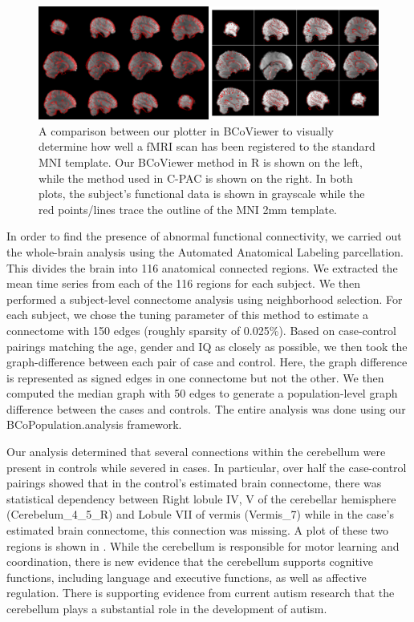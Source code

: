 \documentclass{nature}
\begin{document}
\begin{figure}[tb]
\centering
\includegraphics[width=400pt]{fig/brainconductor/comparison.png}
\caption{A comparison between our plotter in BCoViewer to visually determine how
well
a fMRI scan has been registered to the standard MNI template. Our BCoViewer
method in R
is shown on the left, while the method used in C-PAC is shown on the right. In 
both plots, the subject's functional data is shown in grayscale while the red
points/lines
trace the outline of the MNI 2mm template.}
\label{fig:overlap}
\end{figure}

In order to find the presence of abnormal functional connectivity, we 
carried out the whole-brain analysis using the Automated Anatomical
Labeling\cite{tzourio2002automated} parcellation. This divides the brain into
116 anatomical connected regions. We extracted the mean time series from each
of the 116 regions for each subject. We then performed a subject-level
connectome
analysis using neighborhood selection\cite{meinshausen2006high}. For
each subject, we chose the tuning
parameter of this method to estimate a connectome with 150 edges (roughly
sparsity
of 0.025\%). 
Based on case-control pairings matching the age, gender and IQ as closely as
possible,
we then took the graph-difference between each pair of case and control. Here,
the graph difference is represented as signed edges in one connectome but not
the other. 
We then computed the median graph\cite{han2013sparse} with 
50 edges 
to generate a population-level graph difference between the cases and controls.
The entire analysis was done using our BCoPopulation.analysis framework.

Our analysis determined that several connections within the cerebellum were
present
in controls while severed in cases. In particular, over half the case-control
pairings showed that in the control's estimated brain connectome, 
there was statistical dependency between Right lobule IV, V of the cerebellar
hemisphere (Cerebelum\_4\_5\_R) and Lobule VII of vermis (Vermis\_7) while in
the
case's estimated brain connectome, this connection was missing. A plot
of these two regions is shown in . While the cerebellum
is responsible for motor learning and coordination, there is new evidence that
the cerebellum supports cognitive functions, including language and executive
functions,
as well as affective
regulation\cite{goines2011autoantibodies,braunschweig2012maternal}.
There is supporting evidence from current autism research that the cerebellum
plays
a substantial role in the development of
autism\cite{d2015cerebellar,becker2013autism,wang2014cerebellum}.
\end{document}
